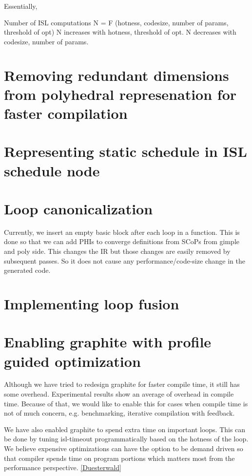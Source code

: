 Essentially,

Number of ISL computations N = F (hotness, codesize, number of params, threshold of opt)
N increases with hotness, threshold of opt.
N decreases with codesize, number of params.

\section{Removing redundant dimensions from polyhedral represenation for faster compilation}

\section{Representing static schedule in ISL schedule node}

\section{Loop canonicalization}
Currently, we insert an empty basic block after each loop in a function. This is done so that
we can add PHIs to converge definitions from SCoPs from gimple and poly side. This changes
the IR but those changes are easily removed by subsequent passes. So it does not cause any
performance/code-size change in the generated code.


\section{Implementing loop fusion}

\section{Enabling graphite with profile guided optimization}
Although we have tried to redesign graphite for faster compile time, it still has some overhead.
Experimental results show an average of {} overhead in compile time.
Because of that, we would like to enable this for cases when compile time is not of much concern,
e.g. benchmarking, iterative compilation with feedback.

We have also enabled graphite to spend extra time on important loops. This can be done by tuning
isl-timeout programmatically based on the hotness of the loop. We believe expensive optimizations
can have the option to be demand driven so that compiler spends time on program portions which matters
most from the performance perspective. \ref{Duesterwald}


